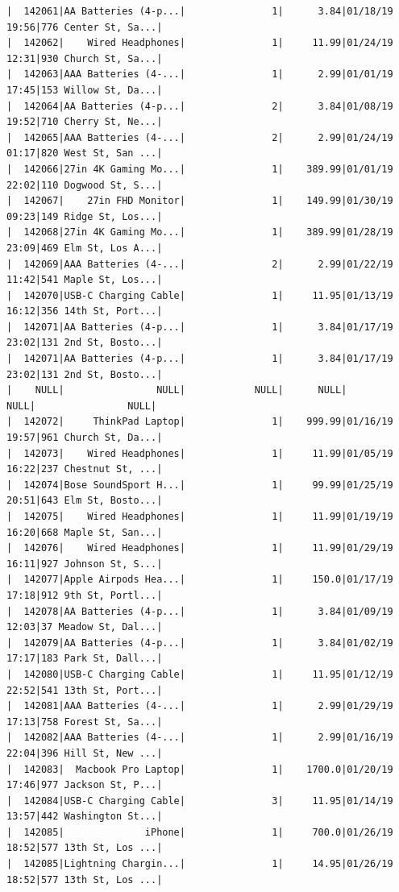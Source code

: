 \documentclass[
  letterpaper,
  DIV=11,
  numbers=noendperiod]{scrartcl}
\begin{document}
\begin{verbatim}
|  142061|AA Batteries (4-p...|               1|      3.84|01/18/19 19:56|776 Center St, Sa...|
|  142062|    Wired Headphones|               1|     11.99|01/24/19 12:31|930 Church St, Sa...|
|  142063|AAA Batteries (4-...|               1|      2.99|01/01/19 17:45|153 Willow St, Da...|
|  142064|AA Batteries (4-p...|               2|      3.84|01/08/19 19:52|710 Cherry St, Ne...|
|  142065|AAA Batteries (4-...|               2|      2.99|01/24/19 01:17|820 West St, San ...|
|  142066|27in 4K Gaming Mo...|               1|    389.99|01/01/19 22:02|110 Dogwood St, S...|
|  142067|    27in FHD Monitor|               1|    149.99|01/30/19 09:23|149 Ridge St, Los...|
|  142068|27in 4K Gaming Mo...|               1|    389.99|01/28/19 23:09|469 Elm St, Los A...|
|  142069|AAA Batteries (4-...|               2|      2.99|01/22/19 11:42|541 Maple St, Los...|
|  142070|USB-C Charging Cable|               1|     11.95|01/13/19 16:12|356 14th St, Port...|
|  142071|AA Batteries (4-p...|               1|      3.84|01/17/19 23:02|131 2nd St, Bosto...|
|  142071|AA Batteries (4-p...|               1|      3.84|01/17/19 23:02|131 2nd St, Bosto...|
|    NULL|                NULL|            NULL|      NULL|          NULL|                NULL|
|  142072|     ThinkPad Laptop|               1|    999.99|01/16/19 19:57|961 Church St, Da...|
|  142073|    Wired Headphones|               1|     11.99|01/05/19 16:22|237 Chestnut St, ...|
|  142074|Bose SoundSport H...|               1|     99.99|01/25/19 20:51|643 Elm St, Bosto...|
|  142075|    Wired Headphones|               1|     11.99|01/19/19 16:20|668 Maple St, San...|
|  142076|    Wired Headphones|               1|     11.99|01/29/19 16:11|927 Johnson St, S...|
|  142077|Apple Airpods Hea...|               1|     150.0|01/17/19 17:18|912 9th St, Portl...|
|  142078|AA Batteries (4-p...|               1|      3.84|01/09/19 12:03|37 Meadow St, Dal...|
|  142079|AA Batteries (4-p...|               1|      3.84|01/02/19 17:17|183 Park St, Dall...|
|  142080|USB-C Charging Cable|               1|     11.95|01/12/19 22:52|541 13th St, Port...|
|  142081|AAA Batteries (4-...|               1|      2.99|01/29/19 17:13|758 Forest St, Sa...|
|  142082|AAA Batteries (4-...|               1|      2.99|01/16/19 22:04|396 Hill St, New ...|
|  142083|  Macbook Pro Laptop|               1|    1700.0|01/20/19 17:46|977 Jackson St, P...|
|  142084|USB-C Charging Cable|               3|     11.95|01/14/19 13:57|442 Washington St...|
|  142085|              iPhone|               1|     700.0|01/26/19 18:52|577 13th St, Los ...|
|  142085|Lightning Chargin...|               1|     14.95|01/26/19 18:52|577 13th St, Los ...|

\end{verbatim}
\end{document}

